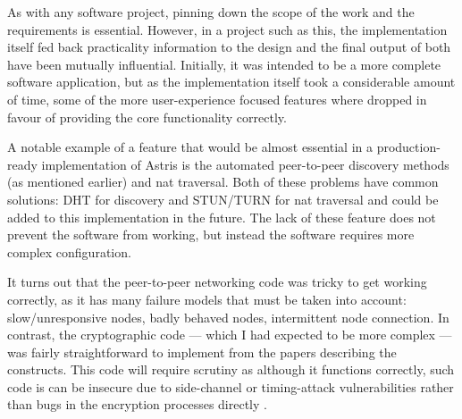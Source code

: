 As with any software project, pinning down the scope of the work and the requirements is essential. However, in a project such as this, the implementation itself fed back practicality information to the design and the final output of both have been mutually influential. Initially, it was intended to be a more complete software application, but as the implementation itself took a considerable amount of time, some of the more user-experience focused features where dropped in favour of providing the core functionality correctly.

A notable example of a feature that would be almost essential in a production-ready implementation of Astris is the automated peer-to-peer discovery methods (as mentioned earlier) and \gls{nat} traversal. Both of these problems have common solutions: DHT  for discovery and STUN/TURN  for \gls{nat} traversal and could be added to this implementation in the future. The lack of these feature does not prevent the software from working, but instead the software requires more complex configuration.

It turns out that the peer-to-peer networking code was tricky to get working correctly, as it has many failure models that must be taken into account: slow/unresponsive nodes, badly behaved nodes, intermittent node connection. In contrast, the cryptographic code --- which I had expected to be more complex --- was fairly straightforward to implement from the papers  describing the constructs. This code will require scrutiny as although it functions correctly, such code is can be insecure due to side-channel or timing-attack vulnerabilities rather than bugs in the encryption processes directly .

